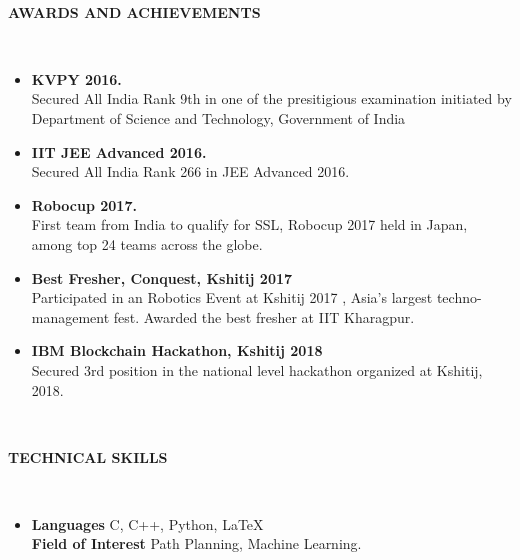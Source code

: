 \documentclass[a4paper,8pt]{article}
\newcommand{\lsep}{-0.5cm}
\newcommand{\resheading}[1]{{\small \colorbox{mygrey}{\begin{minipage}{0.975\textwidth}{\textbf{#1 \vphantom{p\^{E}}}}\end{minipage}}}}
\begin{document}
\hspace{0.5cm}\\[-0.2cm]
\resheading{\textbf{AWARDS AND ACHIEVEMENTS} }\\[\lsep]
\begin{itemize}
\item \noindent \textbf{KVPY 2016.} \\
Secured All India Rank 9th in one of the presitigious examination initiated by Department of Science and Technology, Government of India

\item \noindent \textbf{IIT JEE Advanced 2016.} \\
Secured All India Rank 266 in JEE Advanced 2016.

\item \noindent \textbf{Robocup 2017.} \\
First team from India to qualify for SSL, Robocup 2017 held in Japan, among top 24 teams across the globe.

\item \noindent \textbf{Best Fresher, Conquest, Kshitij 2017} \\
Participated in an Robotics Event at Kshitij 2017 , Asia’s largest techno-management fest. Awarded the best fresher at IIT Kharagpur.

\item \noindent \textbf{IBM Blockchain Hackathon, Kshitij 2018} \\
Secured 3rd position in the national level hackathon organized at Kshitij, 2018.

\end{itemize}

\hspace{0.5cm}\\[-0.2cm]
\resheading{\textbf{TECHNICAL SKILLS} }\\[\lsep]
\begin{itemize}
\item \noindent \textbf{Languages} C, C++, Python, {\LaTeX{}} \\
\textbf{Field of Interest} Path Planning, Machine Learning. \\
\end{itemize}
\end{document}
